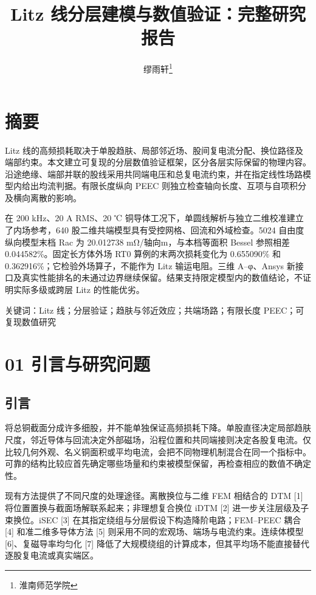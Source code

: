\documentclass[journal,10pt]{IEEEtran}
\begin{document}
\title{Litz 线分层建模与数值验证：完整研究报告}
\author{缪雨轩\thanks{淮南师范学院}}

\maketitle
\FloatBarrier
\section*{摘要}
\hypertarget{abstract}{}
Litz 线的高频损耗取决于单股趋肤、局部邻近场、股间复电流分配、换位路径及端部约束。本文建立可复现的分层数值验证框架，区分各层实际保留的物理内容。沿途绝缘、端部并联的股线采用共同端电压和总复电流约束，并在指定线性场路模型内给出均流判据。有限长度纵向 PEEC 则独立检查轴向长度、互项与自项积分及横向离散的影响。

在 200 kHz、20 A RMS、20 ℃ 铜导体工况下，单圆线解析与独立二维校准建立了内场参考，640 股二维共端模型具有受控网格、回流和外域检查。5024 自由度纵向模型末档 Rac 为 20.012738 mΩ/轴向m，与本档等面积 Bessel 参照相差 0.044582\%。固定长方体外场 RT0 算例的末两次损耗变化为 0.655090\% 和 0.362916\%；它检验外场算子，不能作为 Litz 输运电阻。三维 A–φ、Ansys 新接口及真实性能排名的未通过边界继续保留。结果支持限定模型内的数值结论，不证明实际多级或跨层 Litz 的性能优劣。


关键词：Litz 线；分层验证；趋肤与邻近效应；共端场路；有限长度 PEEC；可复现数值研究


\FloatBarrier
\section*{01 引言与研究问题}
\hypertarget{chapter-01}{}
\subsection*{引言}
\hypertarget{01.introduction.heading}{}
将总铜截面分成许多细股，并不能单独保证高频损耗下降。单股直径决定局部趋肤尺度，邻近导体与回流决定外部磁场，沿程位置和共同端接则决定各股复电流。仅比较几何外观、名义铜面积或平均电流，会把不同物理机制混合在同一个指标中。可靠的结构比较应首先确定哪些场量和约束被模型保留，再检查相应的数值不确定性。


现有方法提供了不同尺度的处理途径。离散换位与二维 FEM 相结合的 DTM [1] 将位置置换与截面场解联系起来；非理想复合换位 iDTM [2] 进一步关注层级及子束换位。iSEC [3] 在其指定绕组与分层假设下构造降阶电路；FEM–PEEC 耦合 [4] 和准二维多导体方法 [5] 则采用不同的宏观场、端场与电流约束。连续体模型 [6]、复磁导率均匀化 [7] 降低了大规模绕组的计算成本，但其平均场不能直接替代逐股复电流或真实端区。
\end{document}
